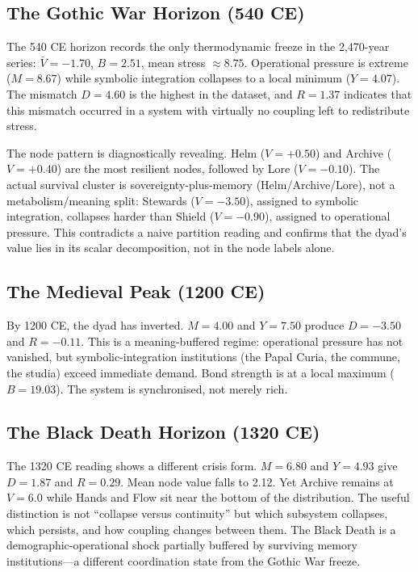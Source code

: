 \documentclass[11pt,a4paper]{article}
\begin{document}
\subsection{The Gothic War Horizon (540 CE)}
The 540 CE horizon records the only thermodynamic freeze in the 2,470-year series: \(\bar{V}=-1.70\), \(B=2.51\), mean stress \(\approx8.75\). Operational pressure is extreme (\(M=8.67\)) while symbolic integration collapses to a local minimum (\(Y=4.07\)). The mismatch \(D=4.60\) is the highest in the dataset, and \(R=1.37\) indicates that this mismatch occurred in a system with virtually no coupling left to redistribute stress.

The node pattern is diagnostically revealing. Helm (\(V=+0.50\)) and Archive (\(V=+0.40\)) are the most resilient nodes, followed by Lore (\(V=-0.10\)). The actual survival cluster is sovereignty-plus-memory (Helm/Archive/Lore), not a metabolism/meaning split: Stewards (\(V=-3.50\)), assigned to symbolic integration, collapses harder than Shield (\(V=-0.90\)), assigned to operational pressure. This contradicts a naive partition reading and confirms that the dyad's value lies in its scalar decomposition, not in the node labels alone.

\subsection{The Medieval Peak (1200 CE)}
By 1200 CE, the dyad has inverted. \(M=4.00\) and \(Y=7.50\) produce \(D=-3.50\) and \(R=-0.11\). This is a meaning-buffered regime: operational pressure has not vanished, but symbolic-integration institutions (the Papal Curia, the commune, the studia) exceed immediate demand. Bond strength is at a local maximum (\(B=19.03\)). The system is synchronised, not merely rich.

\subsection{The Black Death Horizon (1320 CE)}
The 1320 CE reading shows a different crisis form. \(M=6.80\) and \(Y=4.93\) give \(D=1.87\) and \(R=0.29\). Mean node value falls to 2.12. Yet Archive remains at \(V=6.0\) while Hands and Flow sit near the bottom of the distribution. The useful distinction is not ``collapse versus continuity'' but which subsystem collapses, which persists, and how coupling changes between them. The Black Death is a demographic-operational shock partially buffered by surviving memory institutions---a different coordination state from the Gothic War freeze.
\end{document}
